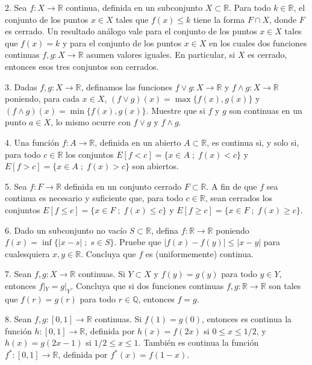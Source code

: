 \documentclass[12pt,oneside]{book}
\begin{document}
2. Sea \(f: X \to \mathbb{R}\) continua, definida en un subconjunto \(X \subset \mathbb{R}\). Para todo \(k \in \mathbb{R}\), el conjunto de los puntos \(x \in X\) tales que \(f(x) \leq k\) tiene la forma \(F \cap X\), donde \(F\) es cerrado. Un resultado análogo vale para el conjunto de los puntos \(x \in X\) tales que \(f(x) = k\) y para el conjunto de los puntos \(x \in X\) en los cuales dos funciones continuas \(f, g: X \to \mathbb{R}\) asumen valores iguales. En particular, si \(X\) es cerrado, entonces esos tres conjuntos son cerrados.

3. Dadas \(f, g: X \to \mathbb{R}\), definamos las funciones \(f \vee g: X \to \mathbb{R}\) y \(f \wedge g: X \to \mathbb{R}\) poniendo, para cada \(x \in X\), \((f \vee g)(x) = \max\{f(x), g(x)\}\) y \((f \wedge g)(x) = \min\{f(x), g(x)\}\). Muestre que si \(f\) y \(g\) son continuas en un punto \(a \in X\), lo mismo ocurre con \(f \vee g\) y \(f \wedge g\).

4. Una función \(f: A \to \mathbb{R}\), definida en un abierto \(A \subset \mathbb{R}\), es continua si, y solo si, para todo \(c \in \mathbb{R}\) los conjuntos \(E[f < c] = \{x \in A \; ; \; f(x) < c\}\) y \(E[f > c] = \{x \in A \; ; \; f(x) > c\}\) son abiertos.

5. Sea \(f: F \to \mathbb{R}\) definida en un conjunto cerrado \(F \subset \mathbb{R}\). A fin de que \(f\) sea continua es necesario y suficiente que, para todo \(c \in \mathbb{R}\), sean cerrados los conjuntos \(E[f \leq c] = \{x \in F \; ; \; f(x) \leq c\}\) y \(E[f \geq c] = \{x \in F \; ; \; f(x) \geq c\}\).

6. Dado un subconjunto no vacío \(S \subset \mathbb{R}\), defina \(f: \mathbb{R} \to \mathbb{R}\) poniendo \(f(x) = \inf\{|x - s| \; ; \; s \in S\}\). Pruebe que \(|f(x) - f(y)| \leq |x - y|\) para cualesquiera \(x, y \in \mathbb{R}\). Concluya que \(f\) es (uniformemente) continua.

7. Sean \(f, g: X \to \mathbb{R}\) continuas. Si \(Y \subset X\) y \(f(y) = g(y)\) para todo \(y \in Y\), entonces \(f|_Y = g|_Y\). Concluya que si dos funciones continuas \(f, g: \mathbb{R} \to \mathbb{R}\) son tales que \(f(r) = g(r)\) para todo \(r \in \mathbb{Q}\), entonces \(f = g\).

8. Sean \(f, g: [0, 1] \to \mathbb{R}\) continuas. Si \(f(1) = g(0)\), entonces es continua la función \(h: [0, 1] \to \mathbb{R}\), definida por \(h(x) = f(2x)\) si \(0 \leq x \leq 1/2\), y \(h(x) = g(2x - 1)\) si \(1/2 \leq x \leq 1\). También es continua la función \(f^*: [0,1] \to \mathbb{R}\), definida por \(f^*(x) = f(1 - x)\).
\end{document}
